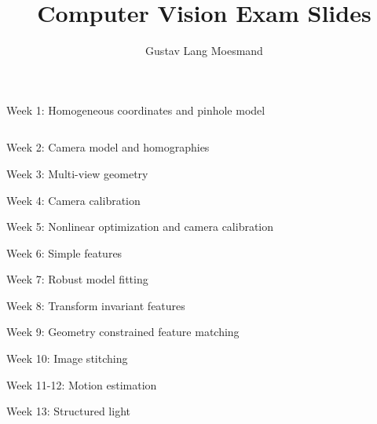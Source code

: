 \documentclass[aspectratio=169,hyperref={pdfpagelabels=false}]{beamer}
\subtitle{Gustav Lang Moesmand}
\title{Computer Vision Exam Slides}
\begin{document}
\inserttitlepage

\begin{frame}{ Week 1: Homogeneous coordinates and pinhole model }
	\begin{column}
	\begin{column}{.5\textwidth}
	\end{column}	
\begin{column}{.5\textwidth}\end{column}	
	\end{column}	
\end{frame}

\begin{frame}{ Week 2: Camera model and homographies }
\end{frame}

\begin{frame}{ Week 3: Multi-view geometry }
\end{frame}

\begin{frame}{ Week 4: Camera calibration }
\end{frame}

\begin{frame}{ Week 5: Nonlinear optimization and camera calibration }
\end{frame}

\begin{frame}{ Week 6: Simple features }
\end{frame}

\begin{frame}{ Week 7: Robust model fitting }
\end{frame}

\begin{frame}{ Week 8: Transform invariant features }
\end{frame}

\begin{frame}{ Week 9: Geometry constrained feature matching }
\end{frame}

\begin{frame}{ Week 10: Image stitching }
\end{frame}

\begin{frame}{ Week 11-12: Motion estimation }
\end{frame}

\begin{frame}{ Week 13: Structured light }
\end{frame}
\end{document}
